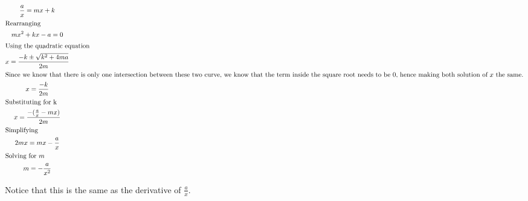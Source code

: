 \documentclass[a4paper]{article}
\begin{document}
\begin{gather*}
\frac{a}{x} = mx+k\\
\shortintertext{Rearranging}
mx^2 + kx - a = 0\\
\shortintertext{Using the quadratic equation}
x = \frac{-k \pm \sqrt{k^2 + 4ma}}{2m}\\
\shortintertext{Since we know that there is only one intersection between these two curve, we know that the term inside the square root needs to be $0$, hence making both solution of $x$ the same.}
x = \frac{-k}{2m}\\
\shortintertext{Substituting for k}
x = \frac{-(\frac{a}{x}-mx)}{2m}\\
\shortintertext{Simplifying}
2mx = mx -\frac{a}{x}\\
\shortintertext{Solving for $m$}
m = -\frac{a}{x^2}\\
\end{gather*}

Notice that this is the same as the derivative of $\frac{a}{x}$.
\end{document}
